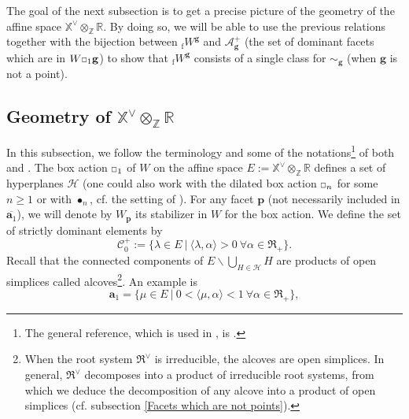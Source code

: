 \documentclass[11pt]{amsart}
\theoremstyle{plain}
\theoremstyle{remark}
\newcommand{\car}{\mbox{\relsize{-5}$\Box$}}
\numberwithin{equation}{section}
\begin{document}
	The goal of the next subsection is to get a precise picture of the geometry of the affine space $\mathbb{X}^\vee\otimes_\mathbb{Z}\mathbb{R}$. By doing so, we will be able to use the previous relations together with the bijection between ${_{\mathrm{f}}W}^\mathbf{g}$ and $\mathcal{A}^+_\mathbf{g}$ (the set of dominant facets which are in $W\car_1\mathbf{g}$) to show that ${_{\mathrm{f}}W}^\mathbf{g}$ consists of a single class for $\sim_\mathbf{g}$ (when $\mathbf{g}$ is not a point).
	\subsection{Geometry of $\mathbb{X}^\vee\otimes_\mathbb{Z}\mathbb{R}$}\label{geometry}
	In this subsection, we follow the terminology and some of the notations\footnote{The general reference, which is used in \cite[§1]{LUSZTIG1980121}, is \cite{cdi_springer_books_10_1007_978_3_540_34491_9}.} of both \cite[§1]{LUSZTIG1980121} and \cite[§4]{Soergel1997KazhdanLusztigPA}. The box action $\car_1$ of $W$ on the affine space $E:=\mathbb{X}^\vee\otimes_\mathbb{Z}\mathbb{R}$ defines a set of hyperplanes $\mathscr{H}$ (one could also work with the dilated box action $\car_n$ for some $n\geq 1$ or with $\bullet_n$, cf. the setting of \cite[§1]{LUSZTIG1980121}). For any facet $\mathbf{p}$ (not necessarily included in $\overline{\mathbf{a}_1}$), we will denote by $W_\mathbf{p}$ its stabilizer in $W$ for the box action. We define the set of strictly dominant elements by 
	$$\mathscr{C}^+_0:=\{\lambda\in E~|~\langle\lambda,\alpha\rangle>0~\forall \alpha\in\mathfrak{R}_+\}. $$Recall that the connected components of $E\backslash\bigcup_{H\in\mathscr{H}}H$ are products of open simplices called alcoves\footnote{When the root system $\mathfrak{R}^\vee$ is irreducible, the alcoves are open simplices. In general, $\mathfrak{R}^\vee$ decomposes into a product of irreducible root systems, from which we deduce the decomposition of any alcove into a product of open simplices (cf.  subsection \ref{Facets which are not points}). }. An example is 
	$$\mathbf{a}_1=\{\mu\in E~|~0<\langle\mu,\alpha\rangle<1~\forall\alpha\in\mathfrak{R}_+\},$$
\end{document}
